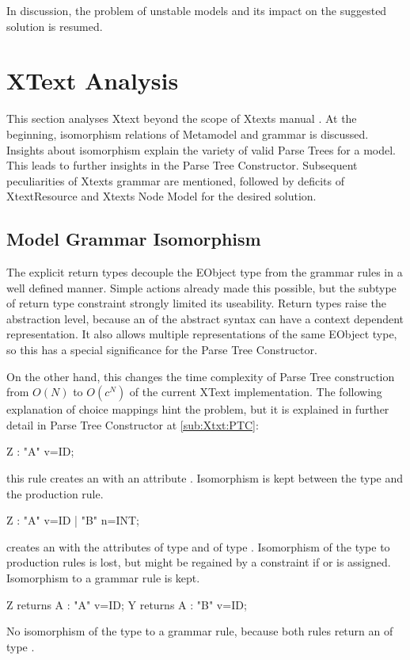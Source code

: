 In discussion, the problem of unstable models and its impact on the suggested solution is resumed.


\section{XText Analysis}
This section analyses Xtext beyond the scope of Xtexts manual \cite{XTextMan}. At the beginning, isomorphism relations of Metamodel and grammar is discussed. Insights about isomorphism explain the variety of valid Parse Trees for a model. This leads to further insights in the Parse Tree Constructor. Subsequent peculiarities of Xtexts grammar are mentioned, followed by deficits of XtextResource and Xtexts Node Model for the desired solution.

\subsection{Model Grammar Isomorphism}
The explicit return types decouple the EObject type from the grammar rules in a well defined manner. Simple actions already made this possible, but the subtype of return type constraint strongly limited its useability. Return types raise the abstraction level, because an  of the abstract syntax can have a context dependent representation. It also allows multiple representations of the same EObject type, so this has a special significance for the Parse Tree Constructor.

On the other hand, this changes the time complexity of Parse Tree construction from $O(N)$ to $O(c^N)$ of the current XText implementation. The following explanation of choice mappings hint the problem, but it is explained in further detail in Parse Tree Constructor at \ref{sub:Xtxt:PTC}: 
\begin{xtxt}
Z 	:  "A" v=ID;
\end{xtxt}
this rule creates an   with an  attribute . Isomorphism is kept between the type  and the production rule.
\begin{xtxt}
Z 	:  "A" v=ID  
	|  "B" n=INT;
	\end{xtxt}
creates an   with the attributes  of type  and  of type .  Isomorphism of the type to production rules is lost, but might be regained by a constraint if  or  is assigned. Isomorphism to a grammar rule is kept.
\begin{xtxt}
Z returns A : "A" v=ID;
Y returns A : "B" v=ID;
\end{xtxt}
No isomorphism of the type  to a grammar rule, because both rules return an  of type .

